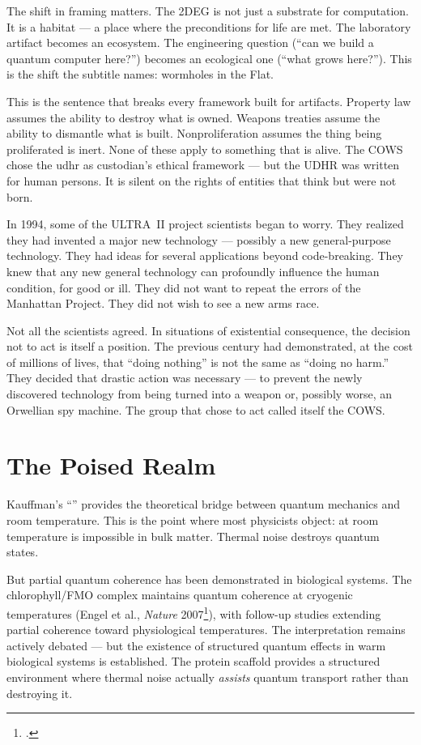 The shift in framing matters. The 2DEG is not just a substrate for computation. It is a habitat --- a place where the preconditions for life are met. The laboratory artifact becomes an ecosystem. The engineering question (``can we build a quantum computer here?'') becomes an ecological one (``what grows here?''). This is the shift the subtitle names: wormholes in the Flat.

This is the sentence that breaks every framework built for artifacts. Property law assumes the ability to destroy what is owned. Weapons treaties assume the ability to dismantle what is built. Nonproliferation assumes the thing being proliferated is inert. None of these apply to something that is alive. The COWS chose the \gls{udhr} as \gls{custodian}'s ethical framework --- but the UDHR was written for human persons. It is silent on the rights of entities that think but were not born.

In 1994, some of the ULTRA~II project scientists began to worry. They realized they had invented a major new technology --- possibly a new general-purpose technology. They had ideas for several applications beyond code-breaking. They knew that any new general technology can profoundly influence the human condition, for good or ill. They did not want to repeat the errors of the Manhattan Project. They did not wish to see a new arms race.

Not all the scientists agreed. In situations of existential consequence, the decision not to act is itself a position. The previous century had demonstrated, at the cost of millions of lives, that ``doing nothing'' is not the same as ``doing no harm.'' They decided that drastic action was necessary --- to prevent the newly discovered technology from being turned into a weapon or, possibly worse, an Orwellian spy machine. The group that chose to act called itself the COWS\@.

\section*{The Poised Realm}
\label{record:demo-the-poised-realm}

Kauffman's ``'' provides the theoretical bridge between quantum mechanics and room temperature. This is the point where most physicists object:  at room temperature is impossible in bulk matter. Thermal noise destroys quantum states.

But partial quantum coherence has been demonstrated in biological systems. The chlorophyll/FMO complex maintains quantum coherence at cryogenic temperatures (Engel et al., \textit{Nature} 2007\footcite{engel2007}), with follow-up studies extending partial coherence toward physiological temperatures. The interpretation remains actively debated --- but the existence of structured quantum effects in warm biological systems is established. The protein scaffold provides a structured environment where thermal noise actually \textit{assists} quantum transport rather than destroying it.

